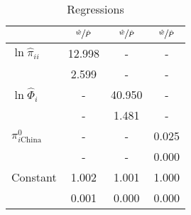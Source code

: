 \begin{table}[htb]
\centering
\caption{Regressions}
\label{table:reg}
\begin{tabular}{lccc}
\hline
 & $\sfrac{\hat{w}}{\hat{P}}$ & $\sfrac{\hat{w}}{\hat{P}}$ & $\sfrac{\hat{w}}{\hat{P}}$ \\
\hline\hline
$\ln\hat{\pi}_{ii}$ & 12.998 & - & - \\
 & 2.599 & - & - \\
$\ln\hat{\Phi}_i$ & - & 40.950 & - \\
 & - & 1.481 & - \\
$\pi^0_{i\text{China}}$ & - & - & 0.025 \\
 & - & - & 0.000 \\
Constant & 1.002 & 1.001 & 1.000 \\
 & 0.001 & 0.000 & 0.000 \\
\hline
\end{tabular}
\end{table}
